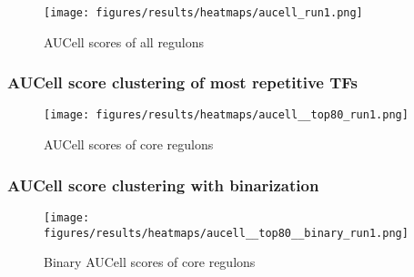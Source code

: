 


\begin{figure}
    \centering
    \texttt{[image: figures/results/heatmaps/aucell\_run1.png]}
    \caption{AUCell scores of all regulons}
    \label{fig:aucell_heatmap}
\end{figure}

\subsubsection{AUCell score clustering of most repetitive TFs}
\begin{figure}
    \centering
    \texttt{[image: figures/results/heatmaps/aucell\_\_top80\_run1.png]}
    \caption{AUCell scores of core regulons}
    \label{fig:aucell_top80}
\end{figure}

\subsubsection{AUCell score clustering with binarization}
\begin{figure}
    \centering
    \texttt{[image: figures/results/heatmaps/aucell\_\_top80\_\_binary\_run1.png]}
    \caption{Binary AUCell scores of core regulons}
    \label{fig:aucell_top80_binary}
\end{figure}

